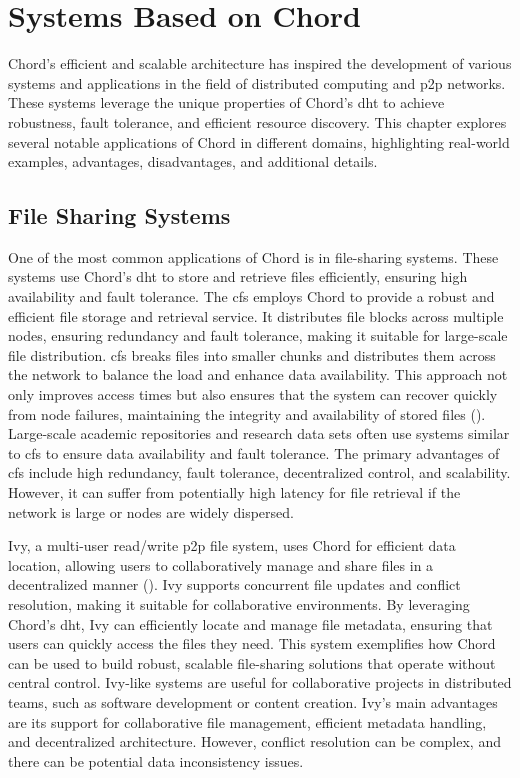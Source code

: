 \chapter{Systems Based on Chord}
Chord's efficient and scalable architecture has inspired the development of various systems and applications in the field of distributed computing and \gls{p2p} networks.
These systems leverage the unique properties of Chord's \gls{dht} to achieve robustness, fault tolerance, and efficient resource discovery.
This chapter explores several notable applications of Chord in different domains, highlighting real-world examples, advantages, disadvantages, and additional details.

\section{File Sharing Systems}
One of the most common applications of Chord is in file-sharing systems.
These systems use Chord's \gls{dht} to store and retrieve files efficiently, ensuring high availability and fault tolerance.
The \gls{cfs} employs Chord to provide a robust and efficient file storage and retrieval service.
It distributes file blocks across multiple nodes, ensuring redundancy and fault tolerance, making it suitable for large-scale file distribution.
\gls{cfs} breaks files into smaller chunks and distributes them across the network to balance the load and enhance data availability.
This approach not only improves access times but also ensures that the system can recover quickly from node failures, maintaining the integrity and availability of stored files (\cite{Dabek2001}).
Large-scale academic repositories and research data sets often use systems similar to \gls{cfs} to ensure data availability and fault tolerance.
The primary advantages of \gls{cfs} include high redundancy, fault tolerance, decentralized control, and scalability.
However, it can suffer from potentially high latency for file retrieval if the network is large or nodes are widely dispersed.

Ivy, a multi-user read/write \gls{p2p} file system, uses Chord for efficient data location, allowing users to collaboratively manage and share files in a decentralized manner (\cite{Ivy2003}).
Ivy supports concurrent file updates and conflict resolution, making it suitable for collaborative environments.
By leveraging Chord's \gls{dht}, Ivy can efficiently locate and manage file metadata, ensuring that users can quickly access the files they need.
This system exemplifies how Chord can be used to build robust, scalable file-sharing solutions that operate without central control.
Ivy-like systems are useful for collaborative projects in distributed teams, such as software development or content creation.
Ivy's main advantages are its support for collaborative file management, efficient metadata handling, and decentralized architecture.
However, conflict resolution can be complex, and there can be potential data inconsistency issues.

